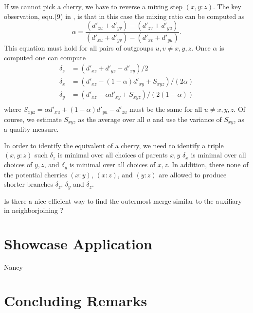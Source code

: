 \documentclass[amsmath]{lni}
\newcommand{\TODO}[1]{\begingroup\color{red}#1\endgroup}
\begin{document}
If we cannot pick a cherry, we have to reverse a mixing step $(x,y:z)$. The
key observation, equ.(9) in \cite{Prohaska:18a}, is that in this case the
mixing ratio can be computed as
\begin{equation}
  \alpha =
  \frac{(d'_{zu}+d'_{yv})-(d'_{zv}+d'_{yu})}%
       {(d'_{xu}+d'_{yv})-(d'_{xv}+d'_{yu})}.
  \label{eq:alpha}
\end{equation} 
This equation must hold for all pairs of outgroups $u,v\ne x,y,z$. Once
$\alpha$ is computed one can compute 
\begin{equation}
  \begin{split}
    \delta_z & = (d'_{xz}+d'_{yz}-d'_{xy})/2  \\
    \delta_x & = (d'_{xz}-(1-\alpha)d'_{xy} + S_{xyz})/(2\alpha) \\
    \delta_y & = (d'_{xz}-\alpha d'_{xy} +    S_{xyz})/(2(1-\alpha)) \\
  \end{split}
\end{equation}
where $S_{xyz}=\alpha d'_{xu}+(1-\alpha)d'_{yu}-d'_{zu}$ must be the same for
all $u\ne x,y,z$. Of course, we estimate $S_{xyz}$ as the average over all
$u$ and use the variance of $S_{xyz}$ as a quality measure.

In order to identify the equivalent of a cherry, we need to identify a
triple $(x,y:z)$ such $\delta_z$ is minimal over all choices of parents
$x,y$ $\delta_x$ is minimal over all choices of $y,z$, and $\delta_y$ is
minimal over all choices of $x,z$. In addition, there none of the potential
cherries $(x:y)$, $(x:z)$, and $(y:z)$ are allowed to produce shorter
branches $\delta_z$, $\delta_y$ and $\delta_z$. 

\TODO{Is there a nice efficient way to find the outermost merge similar
  to the auxiliary in neighborjoining ?}



\section{Showcase Application}

\TODO{Nancy}

\section{Concluding Remarks}


   
\end{document}
